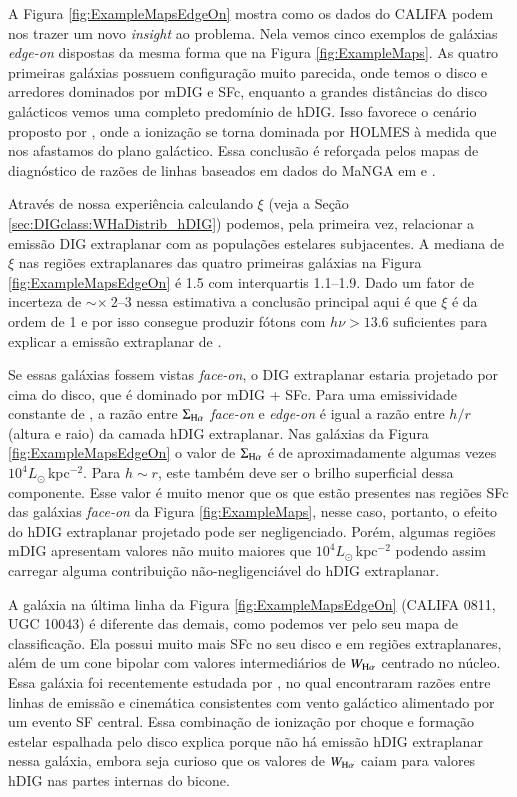 A Figura \ref{fig:ExampleMapsEdgeOn}  mostra como os dados do CALIFA podem nos trazer um novo {\em insight} ao problema. Nela vemos cinco exemplos de galáxias {\em edge-on} dispostas da mesma forma que na Figura \ref{fig:ExampleMaps}. As quatro primeiras galáxias possuem configuração muito parecida, onde temos o disco e arredores dominados por mDIG e SFc, enquanto a grandes distâncias do disco galácticos vemos uma completo predomínio de hDIG. Isso favorece o cenário proposto por \citet{FloresFajardo.etal.2011a}, onde a ionização se torna dominada por HOLMES à medida que nos afastamos do plano galáctico. Essa conclusão é reforçada pelos mapas de diagnóstico de razões de linhas baseados em dados do MaNGA em \citet{Belfiore.etal.2016} e \citet{Zhang.etal.2017a}.

Através de nossa experiência calculando $\xi$ (veja a Seção \ref{sec:DIGclass:WHaDistrib_hDIG}) podemos, pela primeira vez, relacionar a emissão DIG extraplanar com as populações estelares subjacentes. A mediana de $\xi$ nas regiões extraplanares das quatro primeiras galáxias na Figura \ref{fig:ExampleMapsEdgeOn} é 1.5 com interquartis 1.1--1.9. Dado um fator de incerteza de  $\sim \times ~2$--3 nessa estimativa \citep{CidFernandes.etal.2011a} a conclusão principal aqui é que $\xi$ é da ordem de 1 e por isso consegue produzir fótons com $h\nu > 13.6$ suficientes para explicar a emissão extraplanar de \Ha.

Se essas galáxias fossem vistas {\em face-on}, o DIG extraplanar estaria projetado por cima do disco, que é dominado por mDIG + SFc. Para uma emissividade constante de \Ha, a razão entre $\Sigma_{\Ha}$ {\em face-on} e {\em edge-on} é igual a razão entre $h/r$ (altura e raio) da camada hDIG extraplanar. Nas galáxias da Figura \ref{fig:ExampleMapsEdgeOn} o valor de $\Sigma_{\Ha}$ é de aproximadamente algumas vezes $10^4 L_\odot\,$kpc$^{-2}$. Para $h \sim r$, este também deve ser o brilho superficial dessa componente. Esse valor é muito menor que os que estão presentes nas regiões SFc das galáxias {\em face-on} da Figura \ref{fig:ExampleMaps}, nesse caso, portanto, o efeito do hDIG extraplanar projetado pode ser negligenciado. Porém, algumas regiões mDIG apresentam valores não muito maiores que $10^4 L_\odot\,$kpc$^{-2}$ podendo assim carregar alguma contribuição não-negligenciável do hDIG extraplanar.

A galáxia na última linha da Figura \ref{fig:ExampleMapsEdgeOn} (CALIFA 0811, UGC 10043) é diferente das demais, como podemos ver pelo seu mapa de classificação. Ela possui muito mais SFc no seu disco e em regiões extraplanares, além de um cone bipolar com valores intermediários de $W_{\Ha}$ centrado no núcleo. Essa galáxia foi recentemente estudada por \citet{LopezCoba.etal.2017}, no qual encontraram razões entre linhas de emissão e cinemática consistentes com vento galáctico alimentado por um evento SF central. Essa combinação de ionização por choque e formação estelar espalhada pelo disco explica porque não há emissão hDIG extraplanar nessa galáxia, embora seja curioso que os valores de $W_{\Ha}$ caiam para valores hDIG nas partes internas do bicone.


